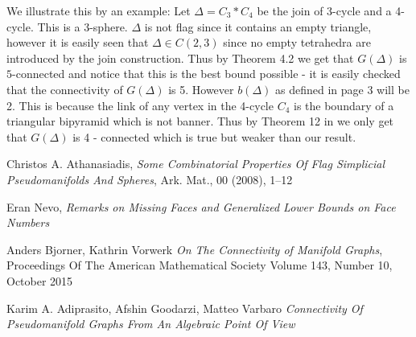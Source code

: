 \documentclass[a4paper]{article}
\begin{document}
{We illustrate this by an example: Let $\Delta = C_3 * C_4$ be the join of 3-cycle and a 4-cycle. This is a 3-sphere. $\Delta$ is not flag since it contains an empty triangle, however it is easily seen that $\Delta \in C(2, 3)$ since no empty tetrahedra are introduced by the join construction.  Thus by Theorem 4.2 we get that $G(\Delta)$ is $5$-connected and notice that this is the best bound possible - it is easily checked that the connectivity of $G(\Delta)$ is 5. However $b(\Delta)$ as defined in \cite{adiprasito} page 3 will be 2. This is because the link of any vertex in the 4-cycle $C_4$ is the boundary of a triangular bipyramid which is not banner. Thus by Theorem 12 in \cite{adiprasito} we only get that $G(\Delta)$ is 4 - connected which is true but weaker than our result. \\




\begin{thebibliography}{9}


Christos A. Athanasiadis,
\textit{Some Combinatorial Properties Of Flag Simplicial
Pseudomanifolds And Spheres}, Ark. Mat., 00 (2008), 1–12

Eran Nevo, 
\textit{Remarks on Missing Faces and Generalized Lower Bounds on Face Numbers}

Anders Bjorner,  Kathrin Vorwerk
\textit{On The Connectivity of Manifold Graphs}, 
Proceedings Of The
American Mathematical Society
Volume 143, Number 10, October 2015

Karim A. Adiprasito, Afshin Goodarzi, Matteo Varbaro
\textit{Connectivity Of Pseudomanifold Graphs From An Algebraic
Point Of View}


\end{thebibliography}



}
\end{document}
